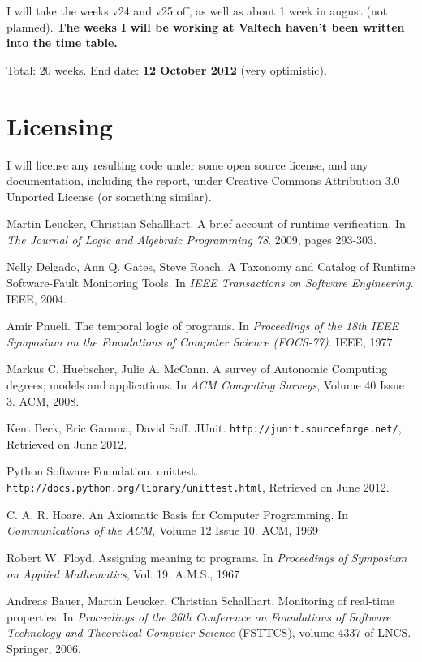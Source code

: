 \documentclass[a4paper,11pt]{article}
\begin{document}
I will take the weeks v24 and v25 off, as well as about 1 week in august (not planned).
\textbf{The weeks I will be working at Valtech haven't been written into the time table.}

Total: 20 weeks. End date: \textbf{12 October 2012} (very optimistic).


\section{Licensing}

I will license any resulting code under some open source license, and any documentation, including the report, under Creative Commons Attribution 3.0 Unported License \cite{cc-by} (or something similar).


\begin{thebibliography}{99}

	Martin Leucker, Christian Schallhart.
	A brief account of runtime verification.
	In \emph{The Journal of Logic and Algebraic Programming 78}.
	2009, pages 293-303.

	Nelly Delgado, Ann Q. Gates, Steve Roach.
	A Taxonomy and Catalog of Runtime Software-Fault Monitoring Tools.
	In \emph{IEEE Transactions on Software Engineering}.
	IEEE, 2004.

	Amir Pnueli.
	The temporal logic of programs. 
	In \emph{Proceedings of the 18th IEEE Symposium on the Foundations of Computer Science (FOCS-77)}.
	IEEE, 1977

	Markus C. Huebscher, Julie A. McCann.
	A survey of Autonomic Computing \- degrees, models and applications.
	In \emph{ACM Computing Surveys}, Volume 40 Issue 3.
	ACM, 2008.
	
	Kent Beck, Eric Gamma, David Saff.
	JUnit.
	\texttt{http://junit.sourceforge.net/},
	Retrieved on June 2012.

	Python Software Foundation.
	unittest.
	\texttt{http://docs.python.org/library/unittest.html},
	Retrieved on June 2012.

	C. A. R. Hoare.
	An Axiomatic Basis for Computer Programming.
	In \emph{Communications of the ACM}, Volume 12 Issue 10.
	ACM, 1969

	Robert W. Floyd.
	Assigning meaning to programs.
	In \emph{Proceedings of Symposium on Applied Mathematics}, Vol. 19.
	A.M.S., 1967

	Andreas Bauer, Martin Leucker, Christian Schallhart.
	Monitoring of real-time properties.
	In \emph{Proceedings of the 26th Conference on Foundations of Software Technology and Theoretical Computer Science} (FSTTCS), volume 4337 of LNCS.
	Springer, 2006.


\end{thebibliography}
\end{document}
